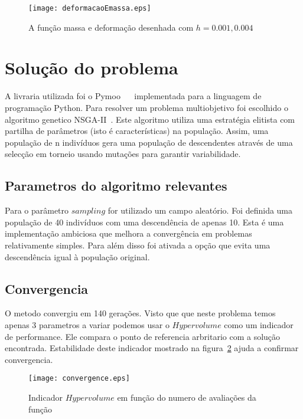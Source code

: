 \documentclass[a4paper,12pt]{article}
\begin{document}
\begin{figure}[h]
\begin{center}
\texttt{[image: deformacaoEmassa.eps]}
\end{center}
\caption{A função massa e deformação desenhada com $h= 0.001, 0.004$}
\label{fig:defIm1}
\end{figure}

\section{Solução do problema}

A livraria utilizada foi o Pymoo~\cite{Pymoo} ~\cite{PymooArt} implementada para a linguagem de programação Python. Para resolver um problema multiobjetivo foi escolhido o algoritmo genetico NSGA-II~\cite{NSGA}. Este algoritmo utiliza uma estratégia elitista com partilha de parâmetros (isto é características) na população. Assim, uma população de n indivíduos gera uma população de descendentes através de uma selecção em torneio usando mutações para garantir variabilidade.

\subsection{Parametros do algoritmo relevantes}

Para o parâmetro $sampling$ for utilizado um campo aleatório. Foi definida uma população de 40 indivíduos com uma descendência de apenas 10. Esta é uma implementação ambiciosa que melhora a convergência em problemas relativamente simples. Para além disso foi ativada a opção que evita uma descendência igual à população original.

\subsection{Convergencia}

O metodo convergiu em 140 gerações. Visto que que neste problema temos apenas 3 parametros a variar podemos usar o $Hypervolume$ como um indicador de performance. Ele compara o ponto de referencia arbritario com a solução encontrada. Estabilidade deste indicador mostrado na figura~\ref{fig:hyper} ajuda a confirmar convergencia.


\begin{figure}[h]
\begin{center}
\texttt{[image: convergence.eps]}
\end{center}
\caption{Indicador $Hypervolume$ em função do numero de avaliações da função}
\label{fig:hyper}
\end{figure}
\end{document}
